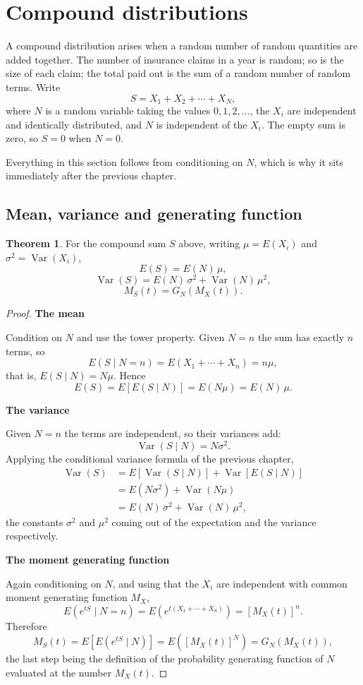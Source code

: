 \documentclass[11pt,a4paper]{article}
\theoremstyle{definition}
\newtheorem{thm}{Theorem}[subsection]
\newcommand{\subhead}[1]{%
  \par\medskip\noindent\textbf{#1}\par\nobreak\smallskip}
\DeclareMathOperator{\Var}{Var}
\begin{document}
\section{Compound distributions}

A compound distribution arises when a random number of random quantities are
added together. The number of insurance claims in a year is random; so is the
size of each claim; the total paid out is the sum of a random number of random
terms. Write
$$S = X_1 + X_2 + \cdots + X_N ,$$
where $N$ is a random variable taking the values $0, 1, 2, \dots$, the $X_i$ are
independent and identically distributed, and $N$ is independent of the $X_i$.
The empty sum is zero, so $S=0$ when $N=0$.

Everything in this section follows from conditioning on $N$, which is why it
sits immediately after the previous chapter.

\subsection{Mean, variance and generating function}

\begin{thm}
For the compound sum $S$ above, writing $\mu = E(X_i)$ and
$\sigma^{2} = \Var(X_i)$,
$$E(S) = E(N)\,\mu,$$
$$\Var(S) = E(N)\,\sigma^{2} + \Var(N)\,\mu^{2},$$
$$M_S(t) = G_N\!\left(M_X(t)\right).$$
\end{thm}

\begin{proof}
\subhead{The mean}
Condition on $N$ and use the tower property. Given $N=n$ the sum has exactly $n$
terms, so
$$E\left(S \mid N=n\right) = E\left(X_1+\cdots+X_n\right) = n\mu,$$
that is, $E\left(S\mid N\right) = N\mu$.
Hence
$$E(S) = E\left[E\left(S\mid N\right)\right] = E(N\mu) = E(N)\,\mu .$$

\subhead{The variance}
Given $N=n$ the terms are independent, so their variances add:
$$\Var\left(S \mid N\right) = N\sigma^{2}.$$
Applying the conditional variance formula of the previous chapter,
\begin{align*}
\Var(S) &= E\left[\Var\left(S\mid N\right)\right] + \Var\left[E\left(S\mid N\right)\right]\\
        &= E\left(N\sigma^{2}\right) + \Var\left(N\mu\right)\\
        &= E(N)\,\sigma^{2} + \Var(N)\,\mu^{2},
\end{align*}
the constants $\sigma^{2}$ and $\mu^{2}$ coming out of the expectation and the
variance respectively.

\subhead{The moment generating function}
Again conditioning on $N$, and using that the $X_i$ are independent with common
moment generating function $M_X$,
$$E\left(e^{tS} \mid N=n\right) = E\left(e^{t(X_1+\cdots+X_n)}\right)
= \left[M_X(t)\right]^{n}.$$
Therefore
$$M_S(t) = E\left[E\left(e^{tS}\mid N\right)\right]
= E\left(\left[M_X(t)\right]^{N}\right)
= G_N\!\left(M_X(t)\right),$$
the last step being the definition of the probability generating function of $N$
evaluated at the number $M_X(t)$.
\end{proof}
\end{document}
